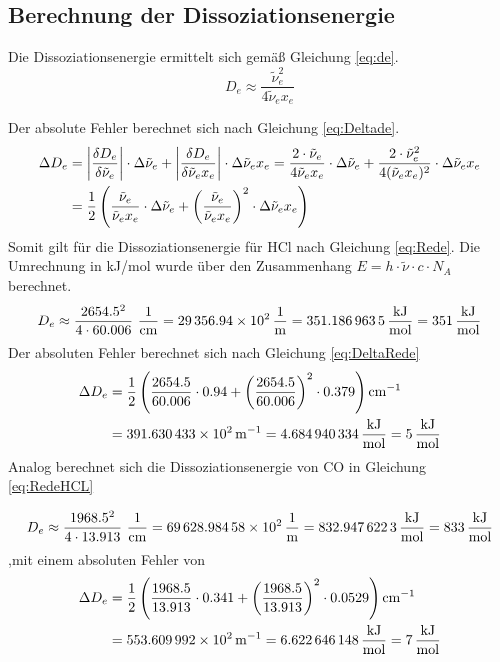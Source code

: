 \subsection{Berechnung der Dissoziationsenergie}
Die Dissoziationsenergie ermittelt sich gemäß Gleichung \ref{eq:de}.
\begin{equation} 
	\label{eq:de}
		D_e \approx \frac{\tilde{\nu}_e^2}{4 \tilde{\nu}_e x_e}
\end{equation}

Der absolute Fehler berechnet sich nach Gleichung \ref{eq:Deltade}.
\begin{align} 	
\Delta D_e &=\left|\frac{\delta D_e}{\delta \tilde{\nu}_e}\right|\cdot \Delta \tilde{\nu}_e + \left|\frac{\delta D_e}{\delta \tilde{\nu}_e x_e}\right|\cdot \Delta \tilde{\nu}_e x_e 
		=\frac{2 \cdot \tilde{\nu}_e}{4 \tilde{\nu}_e x_e}\cdot \Delta \tilde{\nu}_e + \frac{2 \cdot \tilde{\nu}_e^2}{4 (\tilde{\nu}_e x_e)^2}\cdot \Delta \tilde{\nu}_e x_e \notag\\&=\frac{1}{2}\left(\frac{\tilde{\nu}_e}{\tilde{\nu}_e x_e}\cdot \Delta \tilde{\nu}_e + \left(\frac{ \tilde{\nu}_e}{ \tilde{\nu}_e x_e}\right)^2\cdot \Delta \tilde{\nu}_e x_e\right)
\label{eq:Deltade}
\end{align}
Somit gilt für die Dissoziationsenergie für HCl nach Gleichung \ref{eq:Rede}. \newline Die Umrechnung in kJ/mol wurde über den Zusammenhang $E= h \cdot \tilde{\nu} \cdot c \cdot N_A$ berechnet.
\begin{equation} 
	\label{eq:Rede}
		D_e \approx \frac{2654.5^2}{4\cdot60.006} ~\si[per-mode=fraction]
{\per\cm}  = \SI[per-mode=fraction]{29356.94e2}{\per\m} =\SI[per-mode=fraction]{351.1869635}{\kJ\per\mol} =\SI[per-mode=fraction]{351}{\kJ\per\mol} 
\end{equation}
Der absoluten Fehler berechnet sich nach Gleichung \ref{eq:DeltaRede}
\begin{align}
\Delta D_e &= \frac{1}{2} \left( \frac{2654.5}{60.006} \cdot 0.94 + \left(\frac{2654.5}{60.006}\right)^2 \cdot 0.379 \right) \si{cm^{-1}}\notag\\
&=\SI[mode=math]{391.630433e2}{m^{-1}}=\SI[per-mode=fraction]{4.684940334}{\kJ\per\mol}=\SI[per-mode=fraction]{5}{\kJ\per\mol}
\label{eq:DeltaRede}
\end{align}
Analog berechnet sich die Dissoziationsenergie von CO in Gleichung \ref{eq:RedeHCL}

\begin{equation}
\label{eq:RedeHCL}
	D_e \approx \frac{1968.5^2}{4\cdot13.913} ~\si[per-mode=fraction]
{\per\cm}  = \SI[per-mode=fraction]{69628.98458e2}{\per\m} =\SI[per-mode=fraction]{832.9476223}{\kJ\per\mol}=\SI[per-mode=fraction]{833}{\kJ\per\mol}
\end{equation}
,mit einem absoluten Fehler von
\begin{align}
\Delta D_e &= \frac{1}{2} \left( \frac{1968.5}{13.913} \cdot 0.341 + \left(\frac{1968.5}{13.913}\right)^2 \cdot 0.0529 \right) \si{cm^{-1}}\notag\\
&=\SI[mode=math]{553.609992e2}{m^{-1}}=\SI[per-mode=fraction]{6.622646148}{\kJ\per\mol}=\SI[per-mode=fraction]{7}{\kJ\per\mol}
\end{align}

